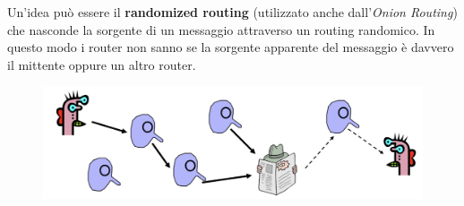 \documentclass[11pt, a4paper, twoside, italian]{report}
\theoremstyle{plain}
\begin{document}
\begin{multicols}{2}
	\noindent
	Un'idea può essere il \textbf{randomized routing} (utilizzato anche dall'\textit{Onion Routing}) che nasconde la sorgente di un messaggio attraverso un routing randomico. In questo modo i router non sanno se la sorgente apparente del messaggio è davvero il mittente oppure un altro router.
\columnbreak
	\begin{figure}[H]
		\centering
		\includegraphics[scale=0.37]{randrout}
	\end{figure}
\end{multicols}
\end{document}
